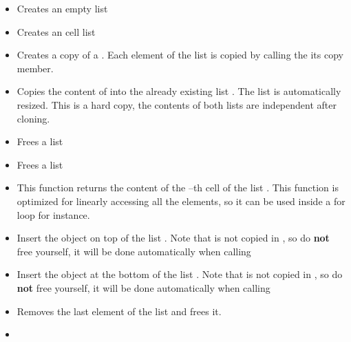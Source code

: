 \begin{itemize}
\item {}
  \sshortdescribe Creates an empty list
\item {}
  \sshortdescribe Creates an cell list
\item {}
  \sshortdescribe Creates a copy of a . Each element of the
  list  is copied by calling the its copy member.
\item {}
  \sshortdescribe Copies the content of  into the already existing
  list . The list  is automatically resized. This is a
  hard copy, the contents of both lists are independent after cloning.
\item {}
  \sshortdescribe Frees a list
\item {}
  \sshortdescribe Frees a list
\item {}
  \sshortdescribe This function returns the content of the --th cell of
  the list . This function is optimized for linearly accessing all the
  elements, so it can be used inside a for loop for instance.
\item {}
  \sshortdescribe Insert the object  on top of the list . Note that
   is not copied in , so do  {\bf not} free  yourself, it
  will be done automatically when calling 
\item {}
  \sshortdescribe Insert the object  at the bottom of the list . Note that
   is not copied in , so do  {\bf not} free  yourself, it
  will be done automatically when calling 
\item {}
  \sshortdescribe Removes the last element of the list  and frees it.
\item {}

\end{itemize}

